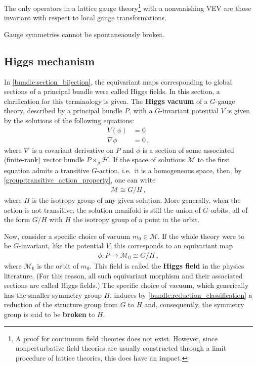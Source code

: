    \begin{theorem}[Elitzur]\label{gauge:elitzur}
        The only operators in a lattice gauge theory\footnote{A proof for continuum field theories does not exist. However, since nonperturbative field theories are usually constructed through a limit procedure of lattice theories, this does have an impact.} with a nonvanishing VEV are those invariant with respect to local gauge transformations.
    \end{theorem}
    \begin{result}
        Gauge symmetries cannot be spontaneaously broken.
    \end{result}

\subsection{Higgs mechanism}\label{section:higgs_mechanism}

    In \cref{bundle:section_bijection}, the equivariant maps corresponding to global sections of a principal bundle were called Higgs fields. In this section, a clarification for this terminology is given. The \textbf{Higgs vacuum} of a $G$-gauge theory, described by a principal bundle $P$, with a $G$-invariant potential $V$ is given by the solutions of the following equations:
    \begin{align}
        V(\phi) &= 0\\
        \nabla\phi &= 0\,,
    \end{align}
    where $\nabla$ is a covariant derivative on $P$ and $\phi$ is a section of some associated (finite-rank) vector bundle $P\times_\rho\mathcal{H}$. If the space of solutions $\mathcal{M}$ to the first equation admits a transitive $G$-action, i.e.~it is a homogeneous space, then, by \cref{group:transitive_action_property}, one can write
    \begin{gather}
        \mathcal{M}\cong G/H\,,
    \end{gather}
    where $H$ is the isotropy group of any given solution. More generally, when the action is not transitive, the solution manifold is still the union of $G$-orbits, all of the form $G/H$ with $H$ the isotropy group of a point in the orbit.

    Now, consider a specific choice of vacuum $m_0\in\mathcal{M}$. If the whole theory were to be $G$-invariant, like the potential $V$, this corresponds to an equivariant map
    \begin{gather}
        \phi:P\rightarrow \mathcal{M}_0\cong G/H\,,
    \end{gather}
    where $\mathcal{M}_0$ is the orbit of $m_0$. This field is called the \textbf{Higgs field} in the physics literature. (For this reason, all such equivariant morphism and their associated sections are called Higgs fields.) The specific choice of vacuum, which generically has the smaller symmetry group $H$, induces by \cref{bundle:reduction_classification} a reduction of the structure group from $G$ to $H$ and, consequently, the symmetry group is said to be \textbf{broken} to $H$.

